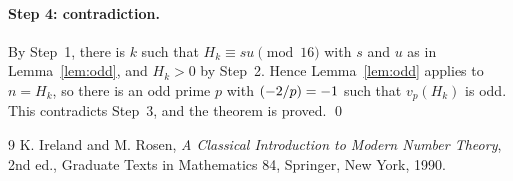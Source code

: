 \documentclass[11pt]{article}
\newcommand{\leg}[2]{\mathchoice{\biggl(\dfrac{#1}{#2}\biggr)}{(#1/#2)}{(#1/#2)}{(#1/#2)}}
\begin{document}
\paragraph{Step 4: contradiction.} By Step~1, there is $k$ such that $H_k\equiv su\pmod{16}$ with $s$ and $u$ as in Lemma~\ref{lem:odd}, and $H_k>0$ by Step~2. Hence Lemma~\ref{lem:odd} applies to $n=H_k$, so there is an odd prime $p$ with $\leg{-2}{p}=-1$ such that $v_p(H_k)$ is odd. This contradicts Step~3, and the theorem is proved.
\qed

\begin{thebibliography}{9}
 K. Ireland and M. Rosen, \emph{A Classical Introduction to Modern Number Theory}, 2nd ed., Graduate Texts in Mathematics 84, Springer, New York, 1990.
\end{thebibliography}
\end{document}
